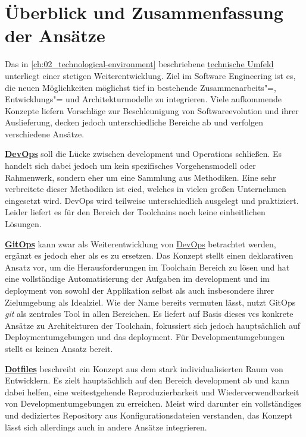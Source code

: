 \section{Überblick und Zusammenfassung der Ansätze}
\label{sec:03-06_overview-and-summary-of-approaches}

Das in \autoref{ch:02_technological-environment} beschriebene \hyperref[ch:02_technological-environment]{technische Umfeld} unterliegt einer stetigen Weiterentwicklung. Ziel im Software Engineering ist es, die neuen Möglichkeiten möglichst tief in bestehende Zusammenarbeits"=, Entwicklungs"= und Architekturmodelle zu integrieren. Viele aufkommende Konzepte liefern Vorschläge zur Beschleunigung von Softwareevolution und ihrer Auslieferung, decken jedoch unterschiedliche Bereiche ab und verfolgen verschiedene Ansätze.

\textbf{\hyperref[sec:03-01_devops]{DevOps}} soll die Lücke zwischen \Gls{development} und Operations schließen. Es handelt sich dabei jedoch um kein spezifisches Vorgehensmodell oder Rahmenwerk, sondern eher um eine Sammlung aus Methodiken. Eine sehr verbreitete dieser Methodiken ist \acrfull{cicd}, welches in vielen großen Unternehmen eingesetzt wird. DevOps wird teilweise unterschiedlich ausgelegt und praktiziert. Leider liefert es für den Bereich der Toolchains noch keine einheitlichen Lösungen.

\textbf{\hyperref[sec:03-03_gitops]{GitOps}} kann zwar als Weiterentwicklung von \hyperref[sec:03-01_devops]{DevOps} betrachtet werden, ergänzt es jedoch eher als es zu ersetzen. Das Konzept stellt einen deklarativen Ansatz vor, um die Herausforderungen im Toolchain Bereich zu lösen und hat eine vollständige Automatisierung der Aufgaben im \Gls{development} und im \Gls{deployment} von sowohl der Applikation selbst als auch insbesondere ihrer Zielumgebung als Idealziel. Wie der Name bereits vermuten lässt, nutzt GitOps \textit{\Gls{git}} als zentrales Tool in allen Bereichen. Es liefert auf Basis dieses \Gls{vcs} konkrete Ansätze zu Architekturen der Toolchain, fokussiert sich jedoch hauptsächlich auf Deploymentumgebungen und das \Gls{deployment}. Für Developmentumgebungen stellt es keinen Ansatz bereit.

\textbf{\hyperref[sec:03-04_dotfiles]{Dotfiles}} beschreibt ein Konzept aus dem stark individualisierten Raum von Entwicklern. Es zielt hauptsächlich auf den Bereich \Gls{development} ab und kann dabei helfen, eine weitestgehende Reproduzierbarkeit und Wiederverwendbarkeit von Developmentumgebungen zu erreichen. Meist wird darunter ein vollständiges und dediziertes Repository aus Konfigurationsdateien verstanden, das Konzept lässt sich allerdings auch in andere Ansätze integrieren.

